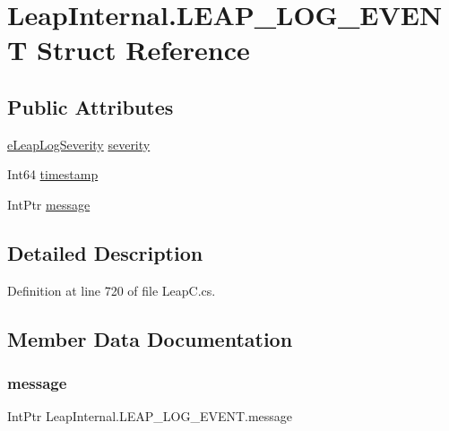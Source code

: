 \hypertarget{struct_leap_internal_1_1_l_e_a_p___l_o_g___e_v_e_n_t}{}\section{Leap\+Internal.\+L\+E\+A\+P\+\_\+\+L\+O\+G\+\_\+\+E\+V\+E\+NT Struct Reference}
\label{struct_leap_internal_1_1_l_e_a_p___l_o_g___e_v_e_n_t}
\subsection*{Public Attributes}
\begin{DoxyCompactItemize}
\item 
\mbox{\hyperlink{namespace_leap_internal_ae47258155c35d1f200b0dd25bd0adb5b}{e\+Leap\+Log\+Severity}} \mbox{\hyperlink{struct_leap_internal_1_1_l_e_a_p___l_o_g___e_v_e_n_t_af08da5c9f1c97a5553bdc1d8dc48495e}{severity}}
\item 
Int64 \mbox{\hyperlink{struct_leap_internal_1_1_l_e_a_p___l_o_g___e_v_e_n_t_af1e2c622bfd1802af9f4b9a49b2f641b}{timestamp}}
\item 
Int\+Ptr \mbox{\hyperlink{struct_leap_internal_1_1_l_e_a_p___l_o_g___e_v_e_n_t_a7d33ac90b2cafd409261d0762bfad298}{message}}
\end{DoxyCompactItemize}


\subsection{Detailed Description}


Definition at line 720 of file Leap\+C.\+cs.



\subsection{Member Data Documentation}
\mbox{\label{struct_leap_internal_1_1_l_e_a_p___l_o_g___e_v_e_n_t_a7d33ac90b2cafd409261d0762bfad298}} 
\subsubsection{\texorpdfstring{message}{message}}
{\footnotesize\ttfamily Int\+Ptr Leap\+Internal.\+L\+E\+A\+P\+\_\+\+L\+O\+G\+\_\+\+E\+V\+E\+N\+T.\+message}



